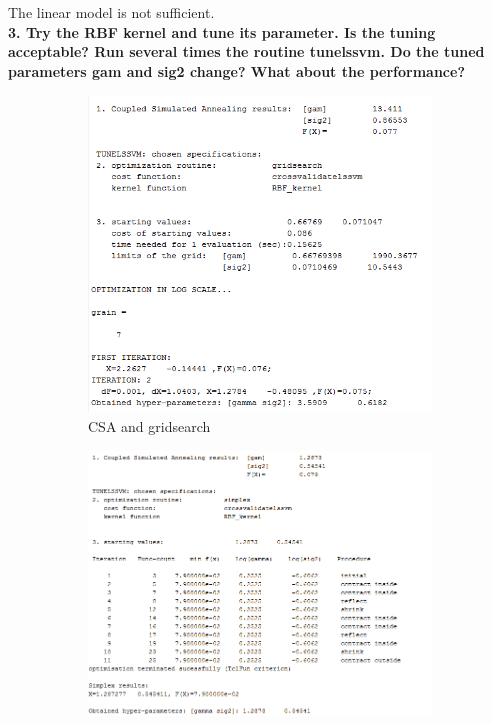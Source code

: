 \documentclass[11pt,oneside,a4paper]{article}
\begin{document}
The linear model is not sufficient.\\
\textbf{3. Try the RBF kernel and tune its parameter. Is the tuning acceptable? Run several times the routine tunelssvm. Do the tuned parameters gam and sig2 change? What about the performance?}\\


\begin{figure}[H]
	\begin{subfigure}[b]{0.4\textwidth}
		\includegraphics[width=\textwidth]{../Figures/breast_CSA_grid}
		\caption{CSA and gridsearch}
	\end{subfigure}
	\begin{subfigure}[b]{0.4\textwidth}
		\includegraphics[width=\textwidth]{../Figures/breast_CSA_simp}

\end{subfigure}
\end{figure}
\end{document}
